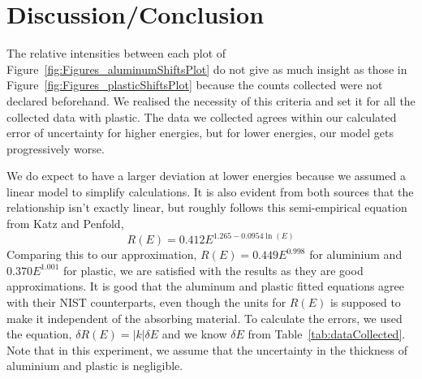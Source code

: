 


\section{Discussion/Conclusion}

\label{sec:discussion_conclusion} The relative intensities between each plot of Figure~\ref{fig:Figures_aluminumShiftsPlot} do not give as much insight as those in Figure~\ref{fig:Figures_plasticShiftsPlot} because the counts collected were not declared beforehand. We realised the necessity of this criteria and set it for all the collected data with plastic. The data we collected agrees within our calculated error of uncertainty for higher energies, but for lower energies, our model gets progressively worse. 

We do expect to have a larger deviation at lower energies because we assumed a linear model to simplify calculations. It is also evident from both sources that the relationship isn't exactly linear, but roughly follows this semi-empirical equation from Katz and Penfold,\cite{RevModPhys.24.28} 
\begin{equation}
	R(E) = 0.412 E^{1.265 - 0.0954 \ln(E)} 
	\label{eq:acceptedEq} 
\end{equation} %
Comparing this to our approximation, $R(E) = 0.449 E^{0.998}$ for aluminium and $0.370 E^{1.001}$ for plastic, we are satisfied with the results as they are good approximations.  It is good that the aluminum and plastic fitted equations agree with their NIST counterparts, even though the units for $R(E)$ is supposed to make it independent of the absorbing material. To calculate the errors, we used the equation,\cite{093570275X} $\delta R(E) = |k| \delta E$ and we know $\delta E$ from Table~\ref{tab:dataCollected}. Note that in this experiment, we assume that the uncertainty in the thickness of aluminium and plastic is negligible. 

